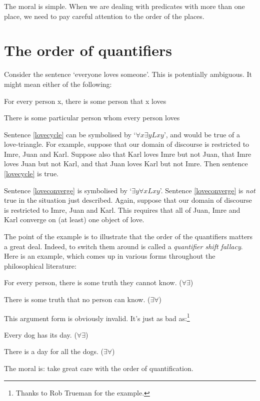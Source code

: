 The moral is simple. When we are dealing with predicates with more than one place, we need to pay careful attention to the order of the places.


\section{The order of quantifiers}
Consider the sentence `everyone loves someone'. This is potentially ambiguous. It might mean either of the following:
	\begin{earg}
		\item[\ex{lovecycle}] For every person x, there is some person that x loves
		\item[\ex{loveconverge}] There is some particular person whom every person loves
	\end{earg}
Sentence \ref{lovecycle} can be symbolised by `$\forall x \exists y Lxy$', and would be true of a love-triangle. For example, suppose that our domain of discourse is restricted to Imre, Juan and Karl. Suppose also that Karl loves Imre but not Juan, that Imre loves Juan but not Karl, and that Juan loves Karl but not Imre. Then sentence \ref{lovecycle} is true. 

Sentence \ref{loveconverge} is symbolised by `$\exists y \forall x Lxy$'. Sentence \ref{loveconverge} is \emph{not} true in the situation just described. Again, suppose that our domain of discourse is restricted to Imre, Juan and Karl. This requires that all of Juan, Imre and Karl converge on (at least) one object of love. 

The point of the example is to illustrate that the order of the quantifiers matters a great deal. Indeed, to switch them around is called a \emph{quantifier shift fallacy}. Here is an example, which comes up in various forms throughout the philosophical literature:
	\begin{earg}
		\item[] For every person, there is some truth they cannot know. \hfill ($\forall \exists$)
		\item[\therefore] There is some truth that no person can know. \hfill ($\exists \forall$)
	\end{earg}
This argument form is obviously invalid. It's just as bad as:\footnote{Thanks to Rob Trueman for the example.}
	\begin{earg}
		\item[] Every dog has its day. \hfill ($\forall \exists$)
		\item[\therefore] There is a day for all the dogs. \hfill ($\exists \forall$)
	\end{earg}
The moral is: take great care with the order of quantification.

